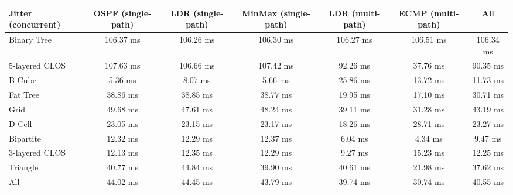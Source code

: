 \begin{tabular}{l|cccccc}
Jitter (concurrent) & OSPF (single-path) & LDR (single-path) & MinMax (single-path) & LDR (multi-path) & ECMP (multi-path) & All       \\
\hline
Binary Tree         & 106.37 ms          & 106.26 ms         & 106.30 ms            & 106.27 ms        & 106.51 ms         & 106.34 ms \\
5-layered CLOS      & 107.63 ms          & 106.66 ms         & 107.42 ms            & 92.26 ms         & 37.76 ms          & 90.35 ms  \\
B-Cube              & 5.36 ms            & 8.07 ms           & 5.66 ms              & 25.86 ms         & 13.72 ms          & 11.73 ms  \\
Fat Tree            & 38.86 ms           & 38.85 ms          & 38.77 ms             & 19.95 ms         & 17.10 ms          & 30.71 ms  \\
Grid                & 49.68 ms           & 47.61 ms          & 48.24 ms             & 39.11 ms         & 31.28 ms          & 43.19 ms  \\
D-Cell              & 23.05 ms           & 23.15 ms          & 23.17 ms             & 18.26 ms         & 28.71 ms          & 23.27 ms  \\
Bipartite           & 12.32 ms           & 12.29 ms          & 12.37 ms             & 6.04 ms          & 4.34 ms           & 9.47 ms   \\
3-layered CLOS      & 12.13 ms           & 12.35 ms          & 12.29 ms             & 9.27 ms          & 15.23 ms          & 12.25 ms  \\
Triangle            & 40.77 ms           & 44.84 ms          & 39.90 ms             & 40.61 ms         & 21.98 ms          & 37.62 ms  \\
All                 & 44.02 ms           & 44.45 ms          & 43.79 ms             & 39.74 ms         & 30.74 ms          & 40.55 ms  \\
\end{tabular}
